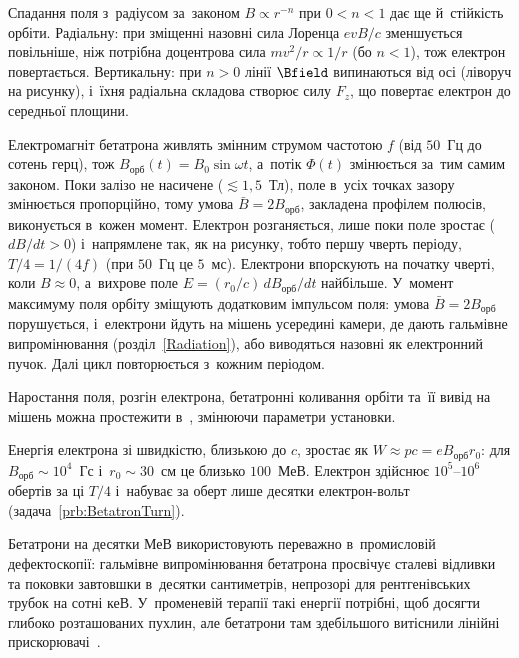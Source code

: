 Спадання поля з~радіусом за~законом $B\propto r^{-n}$ при $0<n<1$ дає ще й~стійкість орбіти. Радіальну: при зміщенні назовні сила Лоренца $evB/c$
зменшується повільніше, ніж потрібна доцентрова сила $mv^2/r\propto1/r$ (бо $n<1$), тож електрон повертається. Вертикальну: при $n>0$ лінії $\Bfield$
випинаються від осі (ліворуч на рисунку), і~їхня радіальна складова створює силу $F_z$, що повертає електрон до середньої площини.

Електромагніт бетатрона живлять змінним струмом частотою $f$ (від $50$~Гц до сотень герц), тож $B_\text{орб}(t)=B_0\sin\omega t$, а~потік $\Phi(t)$ змінюється за~тим самим законом. Поки залізо не насичене ($\lesssim1{,}5$~Тл), поле в~усіх точках зазору змінюється пропорційно, тому умова $\bar B=2B_\text{орб}$, закладена профілем полюсів, виконується в~кожен момент. Електрон розганяється, лише поки поле зростає ($dB/dt>0$) і~напрямлене так, як на рисунку, тобто першу чверть періоду, $T/4=1/(4f)$ (при $50$~Гц це $5$~мс). Електрони впорскують на початку чверті, коли $B\approx0$, а~вихрове поле $E=(r_0/c)\,dB_\text{орб}/dt$ найбільше. У~момент максимуму поля орбіту зміщують додатковим імпульсом поля: умова $\bar B=2B_\text{орб}$ порушується, і~електрони йдуть на мішень усередині камери, де дають гальмівне випромінювання (розділ~\ref{Radiation}), або виводяться назовні як електронний пучок. Далі цикл повторюється з~кожним періодом.

\begin{Simulation}
Наростання поля, розгін електрона, бетатронні коливання орбіти та~її вивід на мішень можна простежити в~, змінюючи параметри установки.
\end{Simulation}

Енергія електрона зі швидкістю, близькою до $c$, зростає як $W\approx pc=eB_\text{орб}r_0$:
для $B_\text{орб}\sim10^4$~Гс і~$r_0\sim30$~см це близько $100$~МеВ. Електрон здійснює $10^5$--$10^6$ обертів за ці $T/4$ і~набуває
за оберт лише десятки електрон-вольт (задача~\ref{prb:BetatronTurn}).

Бетатрони на десятки МеВ використовують переважно в~промисловій дефектоскопії: гальмівне випромінювання бетатрона просвічує сталеві відливки та поковки завтовшки в~десятки сантиметрів, непрозорі для рентгенівських трубок на сотні кеВ. У~променевій терапії такі енергії потрібні, щоб досягти глибоко розташованих пухлин, але бетатрони там здебільшого витіснили лінійні прискорювачі~\cite{ambrose2022betatrons}.

